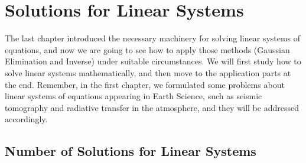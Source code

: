 \chapter{Solutions for Linear Systems}
\label{chap:SolLinSys}

The last chapter introduced the necessary machinery for solving linear systems of equations, and now we are going to see how to apply those methods (Gaussian Elimination and Inverse) under suitable circumstances. We will first study how to solve linear systems mathematically, and then move to the application parts at the end. Remember, in the first chapter, we formulated some problems about linear systems of equations appearing in Earth Science, such as seismic tomography and radiative transfer in the atmosphere, and they will be addressed accordingly.

\section{Number of Solutions for Linear Systems}
\label{section:NoSolLinSys}

